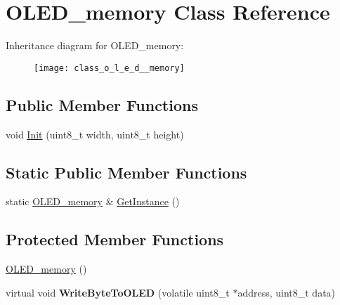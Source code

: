 \hypertarget{class_o_l_e_d__memory}{\section{O\-L\-E\-D\-\_\-memory Class Reference}
\label{class_o_l_e_d__memory}
}
Inheritance diagram for O\-L\-E\-D\-\_\-memory\-:\begin{figure}[H]
\begin{center}
\leavevmode
\texttt{[image: class\_o\_l\_e\_d\_\_memory]}
\end{center}
\end{figure}
\subsection*{Public Member Functions}
\begin{DoxyCompactItemize}
\item 
void \hyperlink{class_o_l_e_d__memory_a5ad8acab1fda3221d490d49bd6aad418}{Init} (uint8\-\_\-t width, uint8\-\_\-t height)
\end{DoxyCompactItemize}
\subsection*{Static Public Member Functions}
\begin{DoxyCompactItemize}
\item 
static \hyperlink{class_o_l_e_d__memory}{O\-L\-E\-D\-\_\-memory} \& \hyperlink{class_o_l_e_d__memory_a8d20efdd852c066b46950bc7b98ff368}{Get\-Instance} ()
\end{DoxyCompactItemize}
\subsection*{Protected Member Functions}
\begin{DoxyCompactItemize}
\item 
\hyperlink{class_o_l_e_d__memory_a237da57c485eed1ba23a9752035f3973}{O\-L\-E\-D\-\_\-memory} ()
\item 
\hypertarget{class_o_l_e_d__memory_a8859cddd8c5639d43ae89bb750984291}{virtual void {\bfseries Write\-Byte\-To\-O\-L\-E\-D} (volatile uint8\-\_\-t $\ast$address, uint8\-\_\-t data)}\label{class_o_l_e_d__memory_a8859cddd8c5639d43ae89bb750984291}

\end{DoxyCompactItemize}
